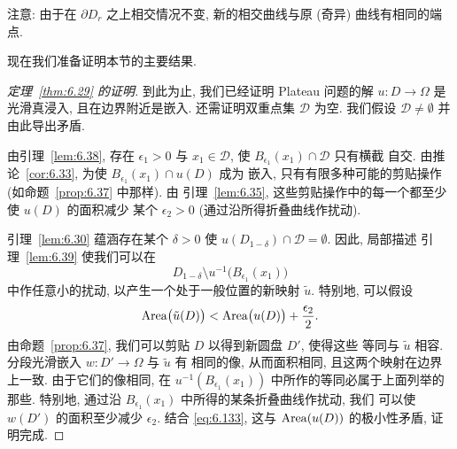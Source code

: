 \begin{remark}
\label{rem:6.40}
注意: 由于在 $\partial D_r$ 之上相交情况不变, 新的相交曲线与原 (奇异)
曲线有相同的端点.
\end{remark}

现在我们准备证明本节的主要结果.

\begin{proof}[定理~\ref{thm:6.29} 的证明]
到此为止, 我们已经证明 Plateau 问题的解 $u:D\to\Omega$ 是光滑真浸入,
且在边界附近是嵌入. 还需证明双重点集 $\mathcal{D}$ 为空. 我们假设
$\mathcal{D}\neq\emptyset$ 并由此导出矛盾.

由引理~\ref{lem:6.38}, 存在 $\epsilon_1>0$ 与
$x_1\in\mathcal{D}$, 使 $B_{\epsilon_1}(x_1)\cap\mathcal{D}$ 只有横截
自交. 由推论~\ref{cor:6.33}, 为使 $B_{\epsilon_1}(x_1)\cap u(D)$ 成为
嵌入, 只有有限多种可能的剪贴操作 (如命题~\ref{prop:6.37} 中那样). 由
引理~\ref{lem:6.35}, 这些剪贴操作中的每一个都至少使 $u(D)$ 的面积减少
某个 $\epsilon_2>0$ (通过沿所得折叠曲线作扰动).

引理~\ref{lem:6.30} 蕴涵存在某个 $\delta>0$ 使
$u(D_{1-\delta})\cap\mathcal{D}=\emptyset$. 因此, 局部描述
引理~\ref{lem:6.39} 使我们可以在
\begin{equation}
D_{1-\delta}\setminus u^{-1}\bigl(B_{\epsilon_1}(x_1)\bigr)
\label{eq:6.132}
\end{equation}
中作任意小的扰动, 以产生一个处于一般位置的新映射 $\tilde{u}$. 特别地,
可以假设
\begin{equation}
\operatorname{Area}\bigl(\tilde{u}(D)\bigr)<\operatorname{Area}\bigl(u(D)\bigr)+\frac{\epsilon_2}{2}.
\label{eq:6.133}
\end{equation}
由命题~\ref{prop:6.37}, 我们可以剪贴 $D$ 以得到新圆盘 $D'$, 使得这些
等同与 $\tilde{u}$ 相容. 分段光滑嵌入 $w:D'\to\Omega$ 与 $\tilde{u}$ 有
相同的像, 从而面积相同, 且这两个映射在边界上一致. 由于它们的像相同,
在 $u^{-1}(B_{\epsilon_1}(x_1))$ 中所作的等同必属于上面列举的那些.
特别地, 通过沿 $B_{\epsilon_1}(x_1)$ 中所得的某条折叠曲线作扰动, 我们
可以使 $w(D')$ 的面积至少减少 $\epsilon_2$. 结合 \eqref{eq:6.133},
这与 $\operatorname{Area}(u(D))$ 的极小性矛盾, 证明完成.
\end{proof}
